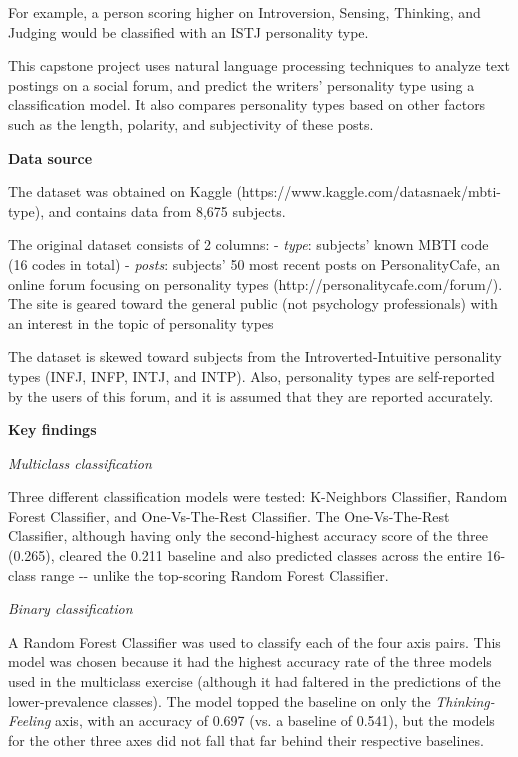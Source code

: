 \documentclass[11pt]{article}
\begin{document}
For example, a person scoring higher on Introversion, Sensing, Thinking,
and Judging would be classified with an ISTJ personality type.

This capstone project uses natural language processing techniques to
analyze text postings on a social forum, and predict the writers'
personality type using a classification model. It also compares
personality types based on other factors such as the length, polarity,
and subjectivity of these posts.

\textbf{Data source}

The dataset was obtained on Kaggle
(https://www.kaggle.com/datasnaek/mbti-type), and contains data from
8,675 subjects.

The original dataset consists of 2 columns: - \emph{type}: subjects'
known MBTI code (16 codes in total) - \emph{posts}: subjects' 50 most
recent posts on PersonalityCafe, an online forum focusing on personality
types (http://personalitycafe.com/forum/). The site is geared toward the
general public (not psychology professionals) with an interest in the
topic of personality types

The dataset is skewed toward subjects from the Introverted-Intuitive
personality types (INFJ, INFP, INTJ, and INTP). Also, personality types
are self-reported by the users of this forum, and it is assumed that
they are reported accurately.

\textbf{Key findings}

\emph{Multiclass classification}

Three different classification models were tested: K-Neighbors
Classifier, Random Forest Classifier, and One-Vs-The-Rest Classifier.
The One-Vs-The-Rest Classifier, although having only the second-highest
accuracy score of the three (0.265), cleared the 0.211 baseline and also
predicted classes across the entire 16-class range -\/- unlike the
top-scoring Random Forest Classifier.

\emph{Binary classification}

A Random Forest Classifier was used to classify each of the four axis
pairs. This model was chosen because it had the highest accuracy rate of
the three models used in the multiclass exercise (although it had
faltered in the predictions of the lower-prevalence classes). The model
topped the baseline on only the \emph{Thinking-Feeling} axis, with an
accuracy of 0.697 (vs. a baseline of 0.541), but the models for the
other three axes did not fall that far behind their respective
baselines.
\end{document}

